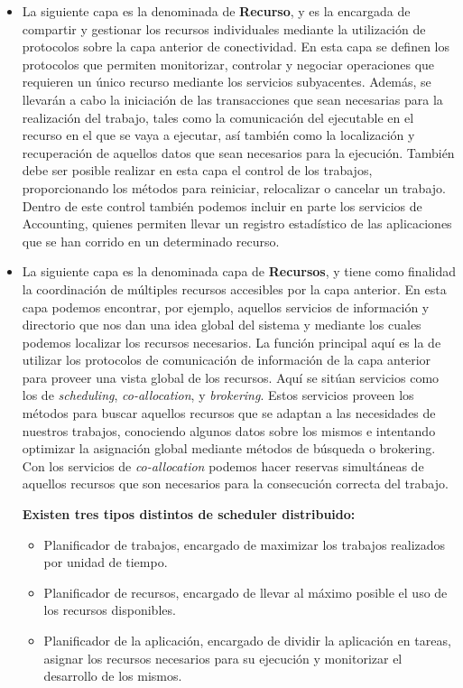 \begin{itemize}
\item La siguiente capa es la denominada de \textbf{Recurso}, y es la encargada de compartir y gestionar los recursos individuales mediante la utilización de protocolos sobre la capa anterior de conectividad. En esta capa se definen los protocolos que permiten monitorizar, controlar y negociar operaciones que requieren un único recurso mediante los servicios subyacentes. 
Además, se llevarán a cabo la iniciación de las transacciones que sean necesarias para la realización del trabajo, tales como la comunicación 
del ejecutable en el recurso en el que se vaya a ejecutar, así también como la localización y recuperación de aquellos datos que sean necesarios para la ejecución.
También debe ser posible realizar en esta capa el control de los trabajos, proporcionando los métodos para reiniciar, relocalizar o cancelar un trabajo. 
Dentro de este control también podemos incluir en parte los servicios de Accounting, quienes permiten llevar un registro estadístico de las aplicaciones que 
se han corrido en un determinado recurso.

\item  La siguiente capa es la denominada capa de \textbf{Recursos}, y tiene como finalidad la coordinación de múltiples recursos accesibles por la capa anterior. En esta capa podemos encontrar, por ejemplo, aquellos servicios de información y directorio que nos dan una idea global del sistema y  mediante los cuales podemos localizar los recursos necesarios. La función principal aquí es la de utilizar los protocolos de comunicación de información de la capa anterior para proveer una vista global de los recursos. Aquí se sitúan servicios como los de \textit{scheduling}, \textit{co-allocation}, y \textit{brokering}. Estos servicios proveen los métodos para buscar aquellos recursos que se adaptan a las necesidades de nuestros trabajos, conociendo algunos datos sobre los mismos e intentando optimizar la asignación global mediante métodos de búsqueda o brokering. Con los servicios de \textit{co-allocation} podemos hacer reservas simultáneas de aquellos recursos que son necesarios para la consecución correcta del trabajo.

      \textbf{Existen tres tipos distintos de scheduler distribuido:}
      \begin{itemize}
      \item  Planificador de trabajos, encargado de maximizar los trabajos realizados por unidad de tiempo.
      \item  Planificador de recursos, encargado de llevar al máximo posible el uso de los recursos disponibles.
      \item  Planificador de la aplicación, encargado de dividir la aplicación en tareas, asignar los recursos necesarios para su ejecución y monitorizar el desarrollo de los mismos.
      \end{itemize}


\end{itemize}
